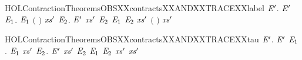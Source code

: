 \begin{SaveVerbatim}{HOLContractionTheoremsOBSXXcontractsXXANDXXTRACEXXlabel}
\HOLTokenTurnstile{} \HOLSymConst{\HOLTokenForall{}} \ensuremath{\HOLBoundVar{E}\sp{\prime}}.
         \ensuremath{\HOLBoundVar{E}\sp{\prime}} \HOLSymConst{\HOLTokenImp{}}
       \HOLSymConst{\HOLTokenForall{}}  \ensuremath{\HOLBoundVar{E}\sb{\mathrm{1}}}.
              \ensuremath{\HOLBoundVar{E}\sb{\mathrm{1}}} \HOLSymConst{\HOLTokenConj{}}  \ensuremath{(} \ensuremath{)}  \HOLSymConst{\HOLTokenImp{}}
           \HOLSymConst{\HOLTokenExists{}}\ensuremath{\HOLBoundVar{xs}\sp{\prime}} \ensuremath{\HOLBoundVar{E}\sb{\mathrm{2}}}.
                \ensuremath{\HOLBoundVar{E}\sp{\prime}} \ensuremath{\HOLBoundVar{xs}\sp{\prime}} \ensuremath{\HOLBoundVar{E}\sb{\mathrm{2}}} \HOLSymConst{\HOLTokenConj{}} \ensuremath{\HOLBoundVar{E}\sb{\mathrm{1}}}  \ensuremath{\HOLBoundVar{E}\sb{\mathrm{2}}} \HOLSymConst{\HOLTokenConj{}}
                \ensuremath{\HOLBoundVar{xs}\sp{\prime}} \HOLSymConst{\HOLTokenLeq{}}   \HOLSymConst{\HOLTokenConj{}}
                \ensuremath{(} \ensuremath{)} \ensuremath{\HOLBoundVar{xs}\sp{\prime}}
\end{SaveVerbatim}
\newcommand{\HOLContractionTheoremsOBSXXcontractsXXANDXXTRACEXXlabel}{\UseVerbatim{HOLContractionTheoremsOBSXXcontractsXXANDXXTRACEXXlabel}}
\begin{SaveVerbatim}{HOLContractionTheoremsOBSXXcontractsXXANDXXTRACEXXtau}
\HOLTokenTurnstile{} \HOLSymConst{\HOLTokenForall{}} \ensuremath{\HOLBoundVar{E}\sp{\prime}}.
         \ensuremath{\HOLBoundVar{E}\sp{\prime}} \HOLSymConst{\HOLTokenImp{}}
       \HOLSymConst{\HOLTokenForall{}} \ensuremath{\HOLBoundVar{E}\sb{\mathrm{1}}}.
              \ensuremath{\HOLBoundVar{E}\sb{\mathrm{1}}} \HOLSymConst{\HOLTokenConj{}}   \HOLSymConst{\HOLTokenImp{}}
           \HOLSymConst{\HOLTokenExists{}}\ensuremath{\HOLBoundVar{xs}\sp{\prime}} \ensuremath{\HOLBoundVar{E}\sb{\mathrm{2}}}.
                \ensuremath{\HOLBoundVar{E}\sp{\prime}} \ensuremath{\HOLBoundVar{xs}\sp{\prime}} \ensuremath{\HOLBoundVar{E}\sb{\mathrm{2}}} \HOLSymConst{\HOLTokenConj{}} \ensuremath{\HOLBoundVar{E}\sb{\mathrm{1}}}  \ensuremath{\HOLBoundVar{E}\sb{\mathrm{2}}} \HOLSymConst{\HOLTokenConj{}}
                \ensuremath{\HOLBoundVar{xs}\sp{\prime}} \HOLSymConst{\HOLTokenLeq{}}   \HOLSymConst{\HOLTokenConj{}}  \ensuremath{\HOLBoundVar{xs}\sp{\prime}}
\end{SaveVerbatim}
